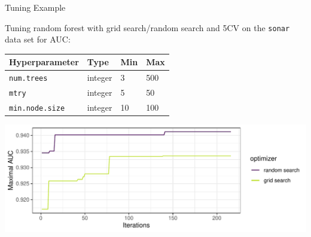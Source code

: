 \begin{vbframe}{Tuning Example}
	
	Tuning random forest with grid search/random search and 5CV on the \texttt{sonar} data set for AUC:
	
	\begin{footnotesize}
		\begin{center}
			\begin{tabular}{|l|l|l|l}
				Hyperparameter          &  Type     & Min & Max \\
				\hline
				\texttt{num.trees}     & integer  & 3 & 500 \\
				\texttt{mtry}          & integer  & 5 & 50  \\
				\texttt{min.node.size} & integer  & 10 & 100\\
			\end{tabular}
		\end{center}
	\end{footnotesize}
	
	\begin{knitrout}\scriptsize
		\color{fgcolor}
		
		{\centering \includegraphics[width=\textwidth]{figure/tuning_example}
		}
		
		
	\end{knitrout}
	
\end{vbframe}

\endlecture

